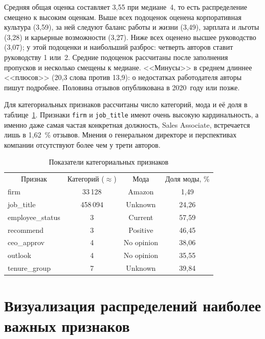 Средняя общая оценка составляет 3,55 при медиане~4, то есть распределение смещено к высоким оценкам. Выше всех подоценок оценена корпоративная культура (3,59), за ней следуют баланс работы и жизни (3,49), зарплата и льготы (3,28) и карьерные возможности (3,27). Ниже всех оценено высшее руководство (3,07); у этой подоценки и наибольший разброс: четверть авторов ставит руководству 1 или~2. Средние подоценок рассчитаны после заполнения пропусков и несколько смещены к медиане. <<Минусы>> в среднем длиннее <<плюсов>> (20,3 слова против 13,9): о недостатках работодателя авторы пишут подробнее. Половина отзывов опубликована в 2020~году или позже.

Для категориальных признаков рассчитаны число категорий, мода и её доля в таблице~\ref{tab:catstats}. Признаки \texttt{firm} и \texttt{job\_title} имеют очень высокую кардинальность, а именно даже самая частая конкретная должность, Sales Associate, встречается лишь в 1,62~\% отзывов. Мнения о генеральном директоре и перспективах компании отсутствуют более чем у трети авторов.

\begin{table}[!ht]
    \centering
    \small
    \begin{tabularx}{\textwidth}{|X|c|c|c|}
        \hline
        \multicolumn{1}{|c|}{Признак} & Категорий (${\approx}$) & Мода & Доля моды, \% \\ \hhline{|=|=|=|=|}
        firm             & 33\,128  & Amazon     & 1,49 \\ \hline
        job\_title       & 458\,094 & Unknown    & 24,26 \\ \hline
        employee\_status & 3        & Current    & 57,59 \\ \hline
        recommend        & 3        & Positive   & 46,45 \\ \hline
        ceo\_approv      & 4        & No opinion & 38,06 \\ \hline
        outlook          & 4        & No opinion & 35,55 \\ \hline
        tenure\_group    & 7        & Unknown    & 39,84 \\ \hline
    \end{tabularx}
    \caption{Показатели категориальных признаков}
    \label{tab:catstats}
\end{table}

\vspace{\baselineskip}\section{Визуализация распределений наиболее важных признаков}\vspace{\baselineskip}

